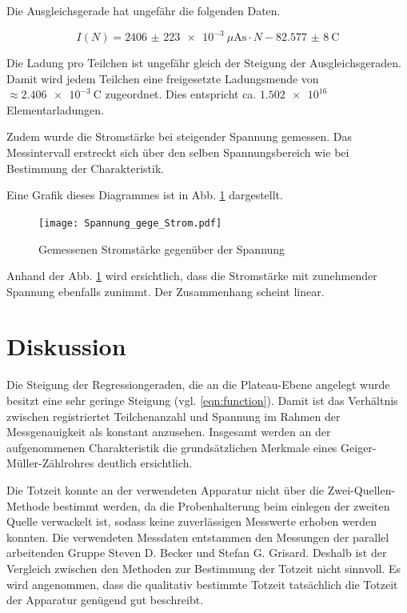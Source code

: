 Die Ausgleichsgerade hat ungefähr die folgenden Daten.

\begin{equation}
  \label{eqn:Augleichsgerade_Ladung}
  I(N) = \SI{2406(223)e-3}{\mu\ampere\second}\cdot N - \SI{82,577(8)}{\coulomb}
\end{equation}

Die Ladung pro Teilchen ist ungefähr gleich der Steigung der Ausgleichsgeraden.
Damit wird jedem Teilchen eine freigesetzte Ladungsmende von $\approx \SI{2,406e-3}{\coulomb}$
zugeordnet. Dies entspricht ca. $\num{1,502e16}$ Elementarladungen.

Zudem wurde die Stromstärke bei steigender Spannung gemessen. Das Messintervall
erstreckt sich über den selben Spannungsbereich wie bei Bestimmung der Charakteristik.

Eine Grafik dieses Diagrammes ist in Abb. \ref{fig:Spannung gegen Strom}
dargestellt.

\begin{figure}
  \centering
  \texttt{[image: Spannung\_gege\_Strom.pdf]}
  \caption{Gemessenen Stromstärke gegenüber der Spannung}
  \label{fig:Spannung gegen Strom}
\end{figure}

Anhand der Abb. \ref{fig:Spannung gegen Strom} wird ersichtlich, dass die Stromstärke
mit zunehmender Spannung ebenfalls zunimmt. Der Zusammenhang scheint linear.

\section{Diskussion}

Die Steigung der Regressiongeraden, die an die Plateau-Ebene angelegt wurde
besitzt eine sehr geringe Steigung (vgl. \ref{eqn:function}).
Damit ist das Verhältnis zwischen registriertet Teilchenanzahl und Spannung
im Rahmen der Messgenauigkeit als konstant anzusehen. Insgesamt werden
an der aufgenommenen Charakteristik die grundsätzlichen Merkmale eines
Geiger-Müller-Zählrohres deutlich ersichtlich.

Die Totzeit konnte an der verwendeten Apparatur nicht über die Zwei-Quellen-Methode
bestimmt werden, da die Probenhalterung beim einlegen der zweiten Quelle
verwackelt ist, sodass keine zuverlässigen Messwerte erhoben werden konnten.
Die verwendeten Messdaten entstammen den Messungen der parallel arbeitenden
Gruppe Steven D. Becker und Stefan G. Grisard.
Deshalb ist der Vergleich zwischen den Methoden zur Bestimmung der Totzeit
nicht sinnvoll. Es wird angenommen, dass die qualitativ bestimmte
Totzeit tatsächlich die Totzeit der Apparatur genügend gut beschreibt.

